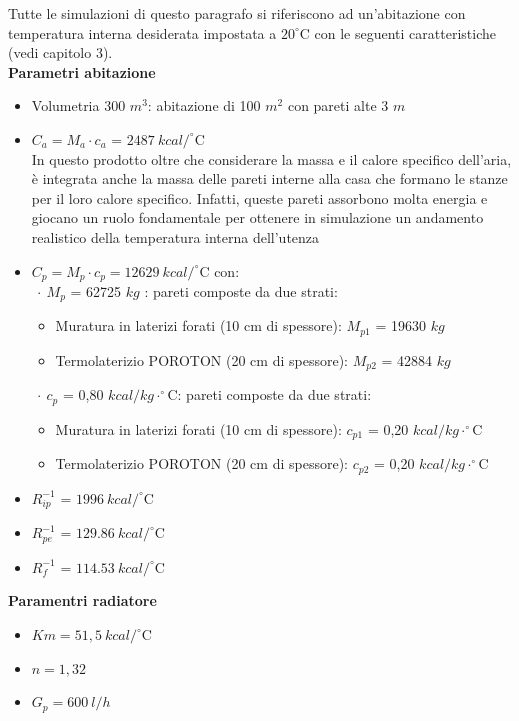 \documentclass[laurea,oneside,11pt]{USiena_tesiLM3}
\begin{document}
Tutte le simulazioni di questo paragrafo si riferiscono ad un'abitazione con temperatura interna desiderata impostata a $20 ^{\circ}$C con le seguenti caratteristiche (vedi capitolo 3).\\
\textbf{Parametri abitazione }
\begin{itemize}
\item[] Volumetria 300 $m^3$: abitazione di 100 $m^2$ con pareti alte 3 $m$
\item[] $C_a = M_a \cdot c_a$ = $2487 \ kcal/^{\circ}$C \\In questo prodotto oltre che considerare la massa e il calore specifico dell'aria, è integrata anche la massa delle pareti interne alla casa che formano le stanze per il loro calore specifico. Infatti, queste pareti assorbono molta energia e giocano un ruolo fondamentale per ottenere in simulazione un andamento realistico della temperatura interna dell'utenza

\item[] $C_p = M_p \cdot c_p =12629 \ kcal/^{\circ}$C con:\\
 $\ \cdot \ M_p$ = 62725 $kg$ : pareti composte da due strati:
\begin{itemize}
\item[] Muratura in laterizi forati (10 cm di spessore): $M_{p1}$ = 19630 $kg$
\item[] Termolaterizio POROTON (20 cm di spessore): $M_{p2}$ = 42884 $kg$ 
\end{itemize}
$\ \cdot \ c_p$ = 0,80 $kcal/kg \cdot ^{\circ}$C: pareti composte da due strati:
\begin{itemize}
\item[] Muratura in laterizi forati (10 cm di spessore): $c_{p1}$ = 0,20 $kcal/kg \cdot ^{\circ}$C
\item[] Termolaterizio POROTON (20 cm di spessore): $c_{p2}$ = 0,20 $kcal/kg \cdot ^{\circ}$C
\end{itemize}

\item[] $R_{ip}^{-1}$ = $1996 \ kcal/ ^{\circ}$C
\item[] $R_{pe}^{-1}$ = $129.86 \ kcal/ ^{\circ}$C
\item[] $R_{f}^{-1}$ = $114.53 \ kcal/ ^{\circ}$C
\end{itemize}

\textbf{Paramentri radiatore}
\begin{itemize}
\item[]$Km = 51,5 \ kcal/^{\circ}$C  
\item[]$n = 1,32$
\item[]$G_p = 600 \ l/h$
\end{itemize}
\end{document}
